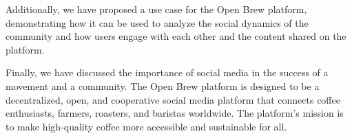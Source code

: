 \documentclass[12pt]{article}
\begin{document}
Additionally, we have proposed a use case for the Open Brew platform, demonstrating how it can be used to analyze the social dynamics of the community and how users engage with each other and the content shared on the platform.

Finally, we have discussed the importance of social media in the success of a movement and a community. The Open Brew platform is designed to be a decentralized, open, and cooperative social media platform that connects coffee enthusiasts, farmers, roasters, and baristas worldwide. The platform's mission is to make high-quality coffee more accessible and sustainable for all.




\newpage
\appendix

\end{document}

